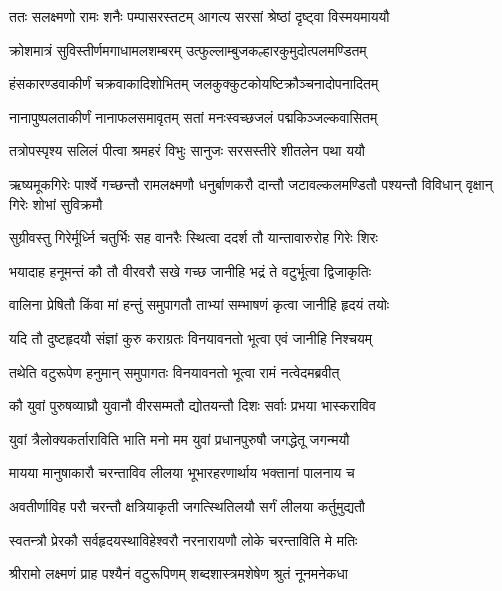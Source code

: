





\twolineshloka
{ततः सलक्ष्मणो रामः शनैः पम्पासरस्तटम्}
{आगत्य सरसां श्रेष्ठां दृष्ट्वा विस्मयमाययौ} %

\twolineshloka
{क्रोशमात्रं सुविस्तीर्णमगाधामलशम्बरम्}
{उत्फुल्लाम्बुजकल्हारकुमुदोत्पलमण्डितम्} %

\twolineshloka
{हंसकारण्डवाकीर्णं चक्रवाकादिशोभितम्}
{जलकुक्कुटकोयष्टिक्रौञ्चनादोपनादितम्} %

\twolineshloka
{नानापुष्पलताकीर्णं नानाफलसमावृतम्}
{सतां मनःस्वच्छजलं पद्मकिञ्जल्कवासितम्} %

\twolineshloka
{तत्रोपस्पृश्य सलिलं पीत्वा श्रमहरं विभुः}
{सानुजः सरसस्तीरे शीतलेन पथा ययौ} %

\threelineshloka
{ऋष्यमूकगिरेः पार्श्वे गच्छन्तौ रामलक्ष्मणौ}
{धनुर्बाणकरौ दान्तौ जटावल्कलमण्डितौ}
{पश्यन्तौ विविधान् वृक्षान् गिरेः शोभां सुविक्रमौ} %

\twolineshloka
{सुग्रीवस्तु गिरेर्मूर्ध्नि चतुर्भिः सह वानरैः}
{स्थित्वा ददर्श तौ यान्तावारुरोह गिरेः शिरः} %

\twolineshloka
{भयादाह हनूमन्तं कौ तौ वीरवरौ सखे}
{गच्छ जानीहि भद्रं ते वटुर्भूत्वा द्विजाकृतिः} %

\twolineshloka
{वालिना प्रेषितौ किंवा मां हन्तुं समुपागतौ}
{ताभ्यां सम्भाषणं कृत्वा जानीहि हृदयं तयोः} %

\twolineshloka
{यदि तौ दुष्टहृदयौ संज्ञां कुरु कराग्रतः}
{विनयावनतो भूत्वा एवं जानीहि निश्चयम्} %

\twolineshloka
{तथेति वटुरूपेण हनुमान् समुपागतः}
{विनयावनतो भूत्वा रामं नत्वेदमब्रवीत्} %

\twolineshloka
{कौ युवां पुरुषव्याघ्रौ युवानौ वीरसम्मतौ}
{द्योतयन्तौ दिशः सर्वाः प्रभया भास्कराविव} %

\twolineshloka
{युवां त्रैलोक्यकर्ताराविति भाति मनो मम}
{युवां प्रधानपुरुषौ जगद्धेतू जगन्मयौ} %

\twolineshloka
{मायया मानुषाकारौ चरन्ताविव लीलया}
{भूभारहरणार्थाय भक्तानां पालनाय च} %

\twolineshloka
{अवतीर्णाविह परौ चरन्तौ क्षत्रियाकृती}
{जगत्स्थितिलयौ सर्गं लीलया कर्तुमुद्यतौ} %

\twolineshloka
{स्वतन्त्रौ प्रेरकौ सर्वहृदयस्थाविहेश्वरौ}
{नरनारायणौ लोके चरन्ताविति मे मतिः} %

\twolineshloka
{श्रीरामो लक्ष्मणं प्राह पश्यैनं वटुरूपिणम्}
{शब्दशास्त्रमशेषेण श्रुतं नूनमनेकधा} %

